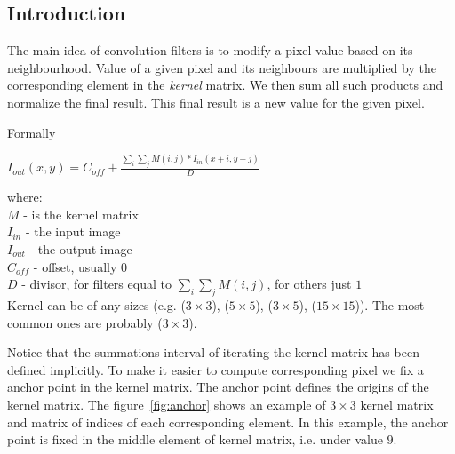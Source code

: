 \documentclass{article}
\begin{document}
\subsection{Introduction}

The main idea of convolution filters is to modify a pixel value based on its neighbourhood.
Value of a given pixel and its neighbours are multiplied by the corresponding element in the \textit{kernel} matrix. We then sum all such products and normalize the final result. This final result is a new value for the given pixel.

Formally

\begin{center}
$I_{out}(x, y) = C_{off} + \frac{\sum_{i} \sum_{j} M(i,j) * I_{in}(x+i, y+j) }{D}$
\end{center}

where:\\
$M$ - is the kernel matrix \\
$I_{in}$ - the input image\\
$I_{out}$ - the output image\\
$C_{off}$ - offset, usually $0$ \\
$D$ - divisor, for filters equal to $\sum_i \sum_j M(i,j)$, for others just $1$\\

Kernel can be of any sizes (e.g. ($3 \times 3$), ($5 \times 5$), ($3 \times 5$), ($15 \times 15$)). The most common ones are probably ($3 \times 3$).

Notice that the summations interval of iterating the kernel matrix has been defined implicitly. To make it easier to compute corresponding pixel we fix a anchor point in the kernel matrix. The anchor point defines the origins of the kernel matrix. The figure~\ref{fig:anchor} shows an example of $3 \times 3$ kernel matrix and matrix of indices of each corresponding element. In this example, the anchor point is fixed in the middle element of kernel matrix, i.e. under value $9$.
\end{document}
